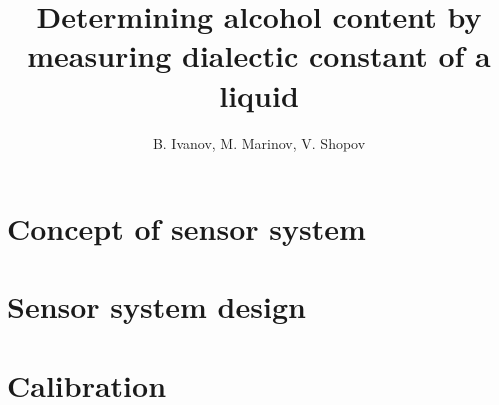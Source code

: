 \documentclass[11pt]{article}
\title{Determining alcohol content by measuring dialectic constant of a liquid}
\author{B. Ivanov, M. Marinov, V. Shopov}
\begin{document}
    \maketitle

    \section{Concept of sensor system}\label{sec:concept}
    

    \section{Sensor system design}\label{sec:sensor-system-design}
    
    
    \section{Calibration}\label{sec:calibration}
    
\end{document}
